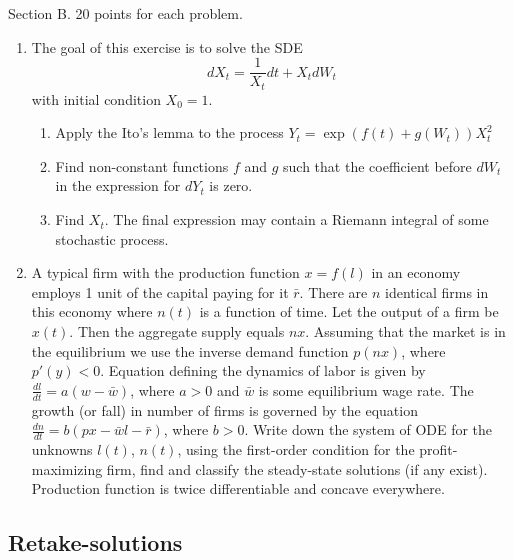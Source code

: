 \documentclass[12pt, a4paper]{article}
\begin{document}
Section B. 20 points for each problem.

\begin{enumerate}[resume]
\item The goal of this exercise is to solve the SDE
\begin{equation}
dX_t=\frac{1}{X_t}dt+X_tdW_t \nonumber
\end{equation}
with initial condition  $X_0=1$.
\begin{enumerate}
\item Apply the Ito's lemma to the process $Y_t=\exp(f(t)+g(W_t))X_t^2$
\item Find non-constant functions $f$ and $g$ such that the coefficient before $dW_t$ in the expression for $dY_t$ is zero.
\item Find $X_t$. The final expression may contain a Riemann integral of some stochastic process.
\end{enumerate}

\item A typical firm with the production function $x=f(l)$ in an economy employs 1 unit of the capital paying for it $\bar{r}$. There are $n$ identical firms in this economy where $n(t)$ is a function of time. Let the output of a firm be $x(t)$. Then the aggregate supply equals $nx$. Assuming that the market is in the equilibrium we use the inverse demand function $p(nx)$, where $p'(y)<0$. Equation defining the dynamics of labor is given by $\frac{dl}{dt}=a(w-\bar{w})$, where $a>0$  and $\bar{w}$  is some equilibrium wage rate. The growth (or fall) in number of firms is governed by the equation $\frac{dn}{dt}=b(px-\bar{w}l-\bar{r})$, where $b>0$. Write down the system of ODE for the unknowns $l(t)$, $n(t)$, using the first-order condition for the profit-maximizing firm, find and classify the steady-state solutions (if any exist). Production function is twice differentiable and concave everywhere.

\end{enumerate}

\subsection{Retake-solutions}
\end{document}
